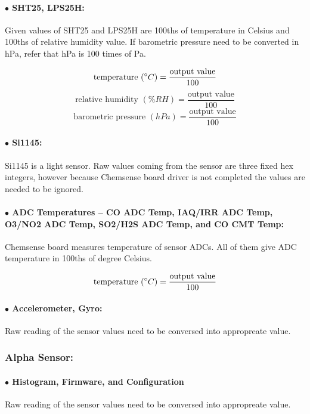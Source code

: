 \paragraph{$\bullet$ SHT25, LPS25H:}
Given values of SHT25 and LPS25H are 100ths of temperature in Celsius and 100ths of relative humidity value.
If barometric pressure need to be converted in hPa, refer that hPa is 100 times of Pa.

{\centering
 \[ \text{temperature }(\degree C) = \frac{\text{output value}}{100} \]
 \[ \text{relative humidity }(\% RH) = \frac{\text{output value}}{100} \]
 \[ \text{barometric pressure }(hPa) = \frac{\text{output value}}{100} \]
 }

\paragraph{$\bullet$ Si1145:}

Si1145 is a light sensor. Raw values coming from the sensor are three fixed hex integers, however because Chemsense board driver is not completed the values are needed to be ignored.


\paragraph{$\bullet$ ADC Temperatures -- CO ADC Temp, IAQ/IRR ADC Temp, O3/NO2 ADC Temp, SO2/H2S ADC Temp, and CO CMT Temp:}
Chemsense board measures temperature of sensor ADCs. All of them give ADC temperature in 100ths of degree Celsius.


{\centering 
 \[ \text{temperature }(\degree C) = \frac{\text{output value}}{100} \]
 \par
}


\paragraph{$\bullet$ Accelerometer, Gyro:}
Raw reading of the sensor values need to be conversed into appropreate value.


\subsubsection{Alpha Sensor:}

\paragraph{$\bullet$ Histogram, Firmware, and Configuration}
Raw reading of the sensor values need to be conversed into appropreate value.